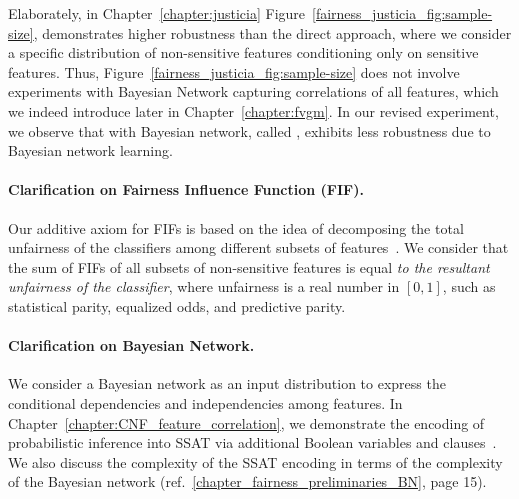 Elaborately, in Chapter~\ref{chapter:justicia} Figure~\ref{fairness_justicia_fig:sample-size}, {\justicia} demonstrates higher robustness than the direct approach, where we consider a specific distribution of non-sensitive features conditioning only on sensitive features. Thus, Figure~\ref{fairness_justicia_fig:sample-size} does not involve experiments with Bayesian Network capturing correlations of all features, which we indeed introduce later in Chapter~\ref{chapter:fvgm}. In our revised experiment, we observe that {\justicia} with Bayesian network, called {\fvgm}, exhibits less robustness due to Bayesian network learning.


\paragraph{Clarification on Fairness Influence Function (FIF).} Our additive axiom for FIFs is based on the idea of decomposing the total unfairness of the classifiers among different subsets of features~\cite{begley2020explainability,lundberg2020explaining}. We consider that the sum of FIFs of all subsets of non-sensitive features is equal \textit{to the resultant unfairness of the classifier}, where unfairness is a real number in $ [0,1] $, such as statistical parity, equalized odds, and predictive parity.

\paragraph{Clarification on Bayesian Network.} We consider a Bayesian network as an input distribution to express the conditional dependencies and independencies among features. In Chapter~\ref{chapter:CNF_feature_correlation}, we demonstrate the encoding of probabilistic inference into SSAT via additional Boolean variables and clauses~\cite{chavira2008probabilistic}. We also discuss the complexity of the SSAT encoding in terms of the complexity of the Bayesian network (ref.~\ref{chapter_fairness_preliminaries_BN}, page 15).

